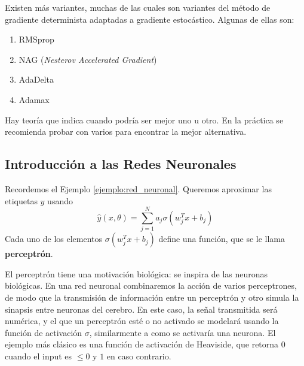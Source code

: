 Existen más variantes, muchas de las cuales son variantes del método de gradiente determinista adaptadas a gradiente estocástico. Algunas de ellas son:
\begin{enumerate}
    \item RMSprop
    \item NAG (\textit{Nesterov Accelerated Gradient})
    \item AdaDelta
    \item Adamax
\end{enumerate}
Hay teoría que indica cuando podría ser mejor uno u otro. En la práctica se recomienda probar con varios para encontrar la mejor alternativa.

\subsection{Introducción a las Redes Neuronales}
Recordemos el Ejemplo \ref{ejemplo:red_neuronal}. Queremos aproximar las etiquetas $y$ usando
$$ \hat{y}(x,\theta) = \displaystyle \sum^N_{j=1}a_j\sigma(w_j^Tx+b_j) $$
Cada uno de los elementos $\sigma(w_j^Tx+b_j)$ define una función, que se le llama \textbf{perceptrón}. 

\newp El perceptrón tiene una motivación biológica: se inspira de las neuronas biológicas. En una red neuronal combinaremos la acción de varios perceptrones, de modo que la transmisión de información entre un perceptrón y otro simula la sinapsis entre neuronas del cerebro. En este caso, la señal transmitida será numérica, y el que un perceptrón esté o no activado se modelará usando la función de activación $\sigma$, similarmente a como se activaría una neurona. El ejemplo más clásico es una función de activación de Heaviside, que retorna $0$ cuando el input es $\leq 0$ y $1$ en caso contrario.

